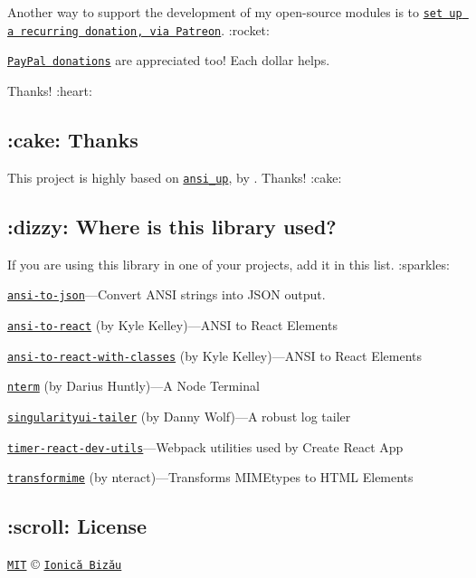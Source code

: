 Another way to support the development of my open-\/source modules is to \href{https://www.patreon.com/ionicabizau}{\tt set up a recurring donation, via Patreon}. \+:rocket\+:

\href{https://www.paypal.com/cgi-bin/webscr?cmd=_s-xclick&hosted_button_id=RVXDDLKKLQRJW}{\tt Pay\+Pal donations} are appreciated too! Each dollar helps.

Thanks! \+:heart\+:

\subsection*{\+:cake\+: Thanks}

This project is highly based on \href{https://github.com/drudru/ansi_up}{\tt {\ttfamily ansi\+\_\+up}}, by \href{https://github.com/drudru/}{\tt }. Thanks! \+:cake\+:

\subsection*{\+:dizzy\+: Where is this library used?}

If you are using this library in one of your projects, add it in this list. \+:sparkles\+:


\begin{DoxyItemize}
\item \href{https://github.com/IonicaBizau/ansi-to-json#readme}{\tt {\ttfamily ansi-\/to-\/json}}—\+Convert A\+N\+SI strings into J\+S\+ON output.
\item \href{https://github.com/nteract/ansi-to-react#readme}{\tt {\ttfamily ansi-\/to-\/react}} (by Kyle Kelley)—\+A\+N\+SI to React Elements
\item \href{https://npmjs.com/package/ansi-to-react-with-classes}{\tt {\ttfamily ansi-\/to-\/react-\/with-\/classes}} (by Kyle Kelley)—\+A\+N\+SI to React Elements
\item \href{https://github.com/dariushuntly/nterm/issues}{\tt {\ttfamily nterm}} (by Darius Huntly)—A Node Terminal
\item \href{https://github.com/HubSpot/Singularity#readme}{\tt {\ttfamily singularityui-\/tailer}} (by Danny Wolf)—A robust log tailer
\item \href{https://github.com/facebookincubator/create-react-app#readme}{\tt {\ttfamily timer-\/react-\/dev-\/utils}}—\+Webpack utilities used by Create React App
\item \href{https://github.com/nteract/transformime#readme}{\tt {\ttfamily transformime}} (by nteract)—\+Transforms M\+I\+M\+Etypes to H\+T\+ML Elements
\end{DoxyItemize}

\subsection*{\+:scroll\+: License}

\href{http://showalicense.com/?fullname=Ionic%C4%83%20Biz%C4%83u%20%3Cbizauionica%40gmail.com%3E%20(http%3A%2F%2Fionicabizau.net)&year=2012#license-mit}{\tt M\+IT} © \href{http://ionicabizau.net}{\tt Ionică Bizău} 